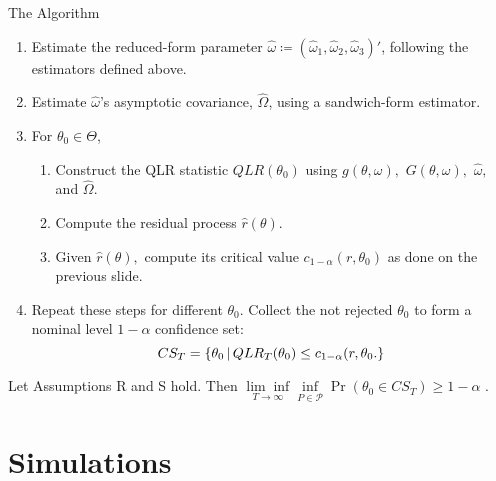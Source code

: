 \documentclass[smaller, aspectratio=169]{beamer}
\begin{document}
\begin{frame}[c]{The Algorithm}
    \bigskip
  \begin{enumerate}
    \item Estimate the reduced-form parameter $\widehat{\omega} \coloneqq \left(\widehat{\omega}_{1}, \widehat{\omega}_{2}, \widehat{\omega}_{3}\right)'$, following the estimators defined above.
      \bigskip
%
    \item Estimate $\widehat{\omega}$'s asymptotic covariance, $\widehat{\Omega}$, using a sandwich-form estimator.
      \bigskip
  
    \item For $\theta_{0}\in \Theta$, 
          \medskip
%
    \begin{enumerate}
      \item Construct the QLR statistic $QLR(\theta_{0})$ using $g(\theta, \omega), $ $G(\theta, \omega), $ $\widehat{\omega}, $ and $\widehat{\Omega}.$
          \medskip
%
      \item Compute the residual process $\widehat{r}(\theta)$.
          \medskip
  
      \item Given $\widehat{r}(\theta), $ compute its critical value $c_{1-\alpha}(r, \theta_{0})$ as done on the previous slide.
%
    \end{enumerate}
      \bigskip
%
  \item Repeat these steps for different $\theta_{0}$. Collect the not rejected $\theta_{0}$ to form a nominal level $1-\alpha $ confidence set: 
%
    \begin{equation*}
      CS_{T} = \left\lbrace \theta_{0} \,\middle\vert\, QLR_{T}(\theta_{0})\leq c_{1-\alpha}(r, \theta_{0}. \right\rbrace
    \end{equation*}
  \end{enumerate}

\begin{theorem}
  \label{Lemma CS}
  Let Assumptions R and S hold. Then 
%
    $\displaystyle \underset{T\rightarrow \infty}{\lim \inf}\underset{P\in \mathcal{P}}{\inf}\Pr \left( \theta_{0}\in CS_{T}\right) \geq 1-\alpha$ .
\end{theorem}

\end{frame}

\section{Simulations}
\end{document}
